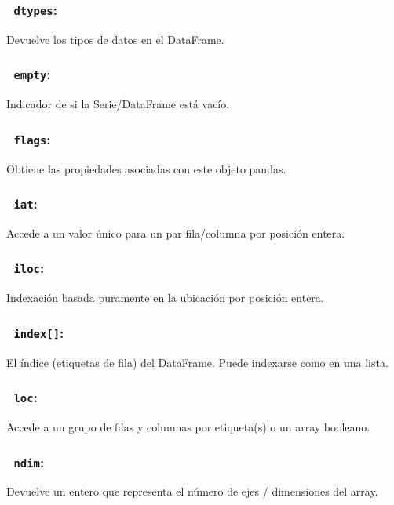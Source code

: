         \subsubsection{~\hspace{2em}\texttt{dtypes}:} Devuelve los tipos de datos en el DataFrame.

        \subsubsection{~\hspace{2em}\texttt{empty}:} Indicador de si la Serie/DataFrame está vacío.

        \subsubsection{~\hspace{2em}\texttt{flags}:} Obtiene las propiedades asociadas con este objeto pandas.

        \subsubsection{~\hspace{2em}\texttt{iat}:} Accede a un valor único para un par fila/columna por posición entera.

        \subsubsection{~\hspace{2em}\texttt{iloc}:} Indexación basada puramente en la ubicación por posición entera.

        \subsubsection{~\hspace{2em}\texttt{index[]}:} El índice (etiquetas de fila) del DataFrame. Puede indexarse como en una lista.

        \subsubsection{~\hspace{2em}\texttt{loc}:} Accede a un grupo de filas y columnas por etiqueta(s) o un array booleano.

        \subsubsection{~\hspace{2em}\texttt{ndim}:} Devuelve un entero que representa el número de ejes / dimensiones del array.

